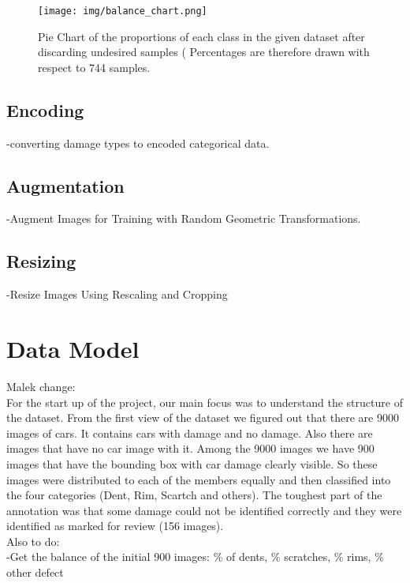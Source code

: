 \documentclass[lang=english,inputenc=utf8,fontsize=10pt]{ldvarticle}
\begin{document}
\begin{figure}[htb]
\centering
  \texttt{[image: img/balance\_chart.png]}
  \caption[]{Pie Chart of the proportions of each class in the given dataset after discarding undesired samples ( Percentages are therefore drawn with respect to 744 samples.}
  \label{fig:balance_chart}
\end{figure}

\subsection*{Encoding}

-converting damage types to encoded categorical data.\\
\subsection*{Augmentation}
-Augment Images for Training with Random Geometric Transformations.\\
\subsection*{Resizing}
-Resize Images Using Rescaling and Cropping\\


\newpage

\section{Data Model}

Malek change:\\
For the start up of the project, our main focus was to understand the structure of the dataset. From the first view of the dataset we figured out that there are 9000 images of cars. It contains cars with damage and no damage. Also there are images that have no car image with it. Among the 9000 images we have 900 images that have the bounding box with car damage clearly visible. So these images were distributed to each of the members equally and then classified into the four categories (Dent, Rim, Scartch and others). The toughest part of the annotation was that some damage could not be identified correctly and they were identified as marked for review (156 images).\\
Also to do:\\
-Get the balance of the initial 900 images: \% of dents, \% scratches, \% rims, \% other defect
\end{document}
